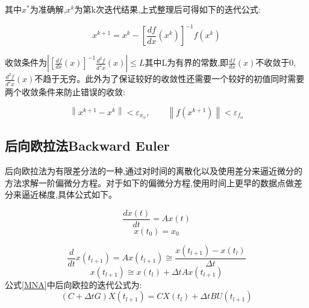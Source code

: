 \documentclass[12pt]{article}
\begin{document}
\begin{sloppypar}
\qquad 其中$x^*$为准确解,$x^k$为第k次迭代结果,上式整理后可得如下的迭代公式:

\begin{equation}
  x^{k+1}=x^k-\left[\frac{d f}{d x}\left(x^k\right)\right]^{-1} f\left(x^k\right)
\end{equation}

\qquad 收敛条件为$\left|\left[\frac{d f}{d x}(x)\right]^{-1} \frac{d^2 f}{d^2 x}(x)\right| \leq L$其中L为有界的常数,即$\frac{d f}{d x}(x)$不收敛于0,$\frac{d^2 f}{d^2 x}(x)$不趋于无穷。此外为了保证较好的收敛性还需要一个较好的初值同时需要两个收敛条件来防止错误的收敛:

\begin{equation}
  \left\|x^{k+1}-x^k\right\|<\varepsilon_{x_\alpha} , \qquad \left\|f\left(x^{k+1}\right)\right\|<\varepsilon_{f_\alpha}
\end{equation}


\subsection{后向欧拉法Backward Euler}\label{BE}
\qquad 后向欧拉法为有限差分法的一种,通过对时间的离散化以及使用差分来逼近微分的方法求解一阶偏微分方程。对于如下的偏微分方程,使用时间上更早的数据点做差分来逼近梯度,具体公式如下。

\begin{equation}
  \frac{dx(t)}{dt}=Ax(t) 
\end{equation}
\begin{equation}
  x(t_0) = x_0
\end{equation}

\begin{equation}
\frac{d}{d t} x\left(t_{l+1}\right)=A x\left(t_{l+1}\right) \cong \frac{x\left(t_{l+1}\right)-x\left(t_l\right)}{\Delta t}
\end{equation}
\begin{equation}
x\left(t_{l+1}\right) \cong x\left(t_l\right)+\Delta t A x\left(t_{l+1}\right)
\end{equation}
公式\ref{MNA}中后向欧拉的迭代公式为:
\begin{equation}
    (C+\Delta tG)X(t_{l+1}) = CX(t_{l}) + \Delta t BU(t_{l+1})
\end{equation}



\end{sloppypar}
\end{document}
